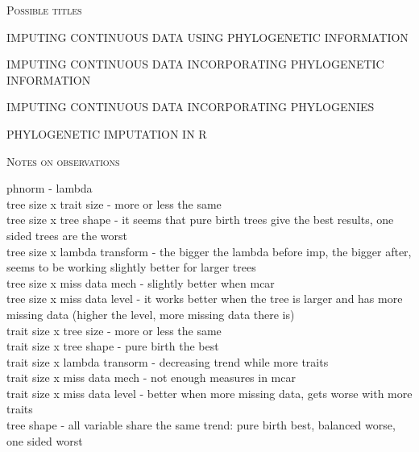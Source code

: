 \documentclass[hidelinks,a4paper]{article}
\renewcommand{\section}[1]{%
\bigskip
\begin{center}
\begin{Large}
\normalfont\scshape #1
\medskip
\end{Large}
\end{center}}
\begin{document}
\begin{multicols}{2}

\section{Possible titles}
IMPUTING CONTINUOUS DATA USING PHYLOGENETIC INFORMATION

IMPUTING CONTINUOUS DATA INCORPORATING PHYLOGENETIC INFORMATION

IMPUTING CONTINUOUS DATA INCORPORATING PHYLOGENIES

PHYLOGENETIC IMPUTATION IN R

\section{Notes on observations}
phnorm - lambda\\
tree size x trait size - more or less the same\\
tree size x tree shape - it seems that pure birth trees give the best results, one sided trees are the worst\\
tree size x lambda transform - the bigger the lambda before imp, the bigger after, seems to be working slightly better for larger trees\\
tree size x miss data mech - slightly better when mcar\\
tree size x miss data level - it works better when the tree is larger and has more missing data (higher the level, more missing data there is)\\

trait size x tree size - more or less the same\\
trait size x tree shape - pure birth the best\\
trait size x lambda transorm - decreasing trend while more traits\\
trait size x miss data mech - not enough measures in mcar\\
trait size x miss data level - better when more missing data, gets worse with more traits\\

tree shape - all variable share the same trend: pure birth best, balanced worse, one sided worst\\

\newpage


\end{multicols}
\end{document}
